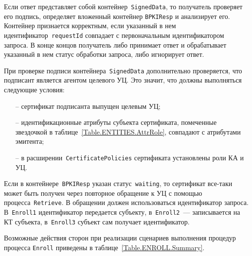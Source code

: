 Если ответ представляет собой контейнер~\texttt{SignedData}, 
то получатель проверяет его подпись, определяет вложенный контейнер 
\texttt{BPKIResp} и анализирует его. Контейнер признается
корректным, если указанный в нем идентификатор~\texttt{requestId}
совпадает с первоначальным идентификатором запроса.
%
В конце концов получатель либо принимает ответ и обрабатывает указанный 
в нем статус обработки запроса, либо игнорирует ответ.

При проверке подписи контейнера~\texttt{SignedData} дополнительно 
проверяется, что подписант является агентом целевого УЦ.
Это значит, что должны выполняться следующие условия:
\begin{itemize}
\item[--]
сертификат подписанта выпущен целевым УЦ;
\item[--]
идентификационные атрибуты субъекта сертификата,
помеченные звездочкой в таблице~\ref{Table.ENTITIES.AttrRole},
совпадают с атрибутами эмитента;
\item[--]
в расширении~\texttt{CertificatePolicies} сертификата установлены роли КА 
и УЦ. 
\end{itemize}

Если в контейнере~\texttt{BPKIResp} указан статус~\texttt{waiting}, то сертификат 
все-таки может быть получен через повторное обращение к УЦ с помощью 
процесса~\texttt{Retrieve}. В обращении должен использоваться 
идентификатор запроса. 
%
В~\texttt{Enroll1} идентификатор передается субъекту,
в~\texttt{Enroll2}~--- записывается на КТ субъекта,
в~\texttt{Enroll3} субъект сам получает идентификатор.

Возможные действия сторон при реализации сценариев выполнения процедур 
процесса \texttt{Enroll} приведены в таблице~\ref{Table.ENROLL.Summary}.

